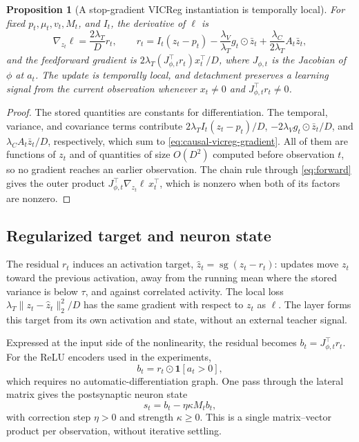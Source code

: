 \documentclass[11pt]{article}
\newtheorem{proposition}{Proposition}
\newcommand{\stopgrad}{\operatorname{sg}}
\begin{document}
\begin{proposition}[A stop-gradient VICReg instantiation is temporally local]
\label{prop:causal-vicreg}
For fixed $p_t,\mu_t,v_t,M_t$, and $I_t$, the derivative of $\ell$ is
\begin{equation}
  \nabla_{z_t}\ell=\frac{2\lambda_T}{D}r_t,
  \qquad
  r_t=I_t(z_t-p_t)-\frac{\lambda_V}{\lambda_T}g_t\odot\bar z_t
       +\frac{\lambda_C}{2\lambda_T}A_t\bar z_t,
  \label{eq:causal-vicreg-gradient}
\end{equation}
and the feedforward gradient is $2\lambda_T(J_{\phi,t}^{\top}r_t)x_t^\top/D$,
where $J_{\phi,t}$ is the Jacobian of $\phi$ at $a_t$. The update is
temporally local, and detachment preserves a learning signal from the current
observation whenever $x_t\neq0$ and $J_{\phi,t}^{\top}r_t\neq0$.
\end{proposition}

\begin{proof}
The stored quantities are constants for differentiation. The temporal,
variance, and covariance terms contribute
$2\lambda_T I_t(z_t-p_t)/D$, $-2\lambda_V g_t\odot\bar z_t/D$, and
$\lambda_C A_t\bar z_t/D$, respectively, which sum to
\cref{eq:causal-vicreg-gradient}. All of them are functions of $z_t$ and of
quantities of size $O(D^2)$ computed before observation $t$, so no gradient
reaches an earlier observation. The chain rule through \cref{eq:forward}
gives the outer product $J_{\phi,t}^{\top}\nabla_{z_t}\ell\,x_t^\top$, which is
nonzero when both of its factors are nonzero.
\end{proof}

\subsection{Regularized target and neuron state}

The residual $r_t$ induces an activation target,
$\widehat z_t=\stopgrad(z_t-r_t)$: updates move $z_t$ toward the previous
activation, away from the running mean where the stored variance is below
$\tau$, and against correlated activity. The local loss
$\lambda_T\lVert z_t-\widehat z_t\rVert_2^2/D$ has the same gradient with
respect to $z_t$ as $\ell$. The layer forms this target from its own
activation and state, without an external teacher signal.

Expressed at the input side of the nonlinearity, the residual becomes
$b_t=J_{\phi,t}^{\top}r_t$. For the ReLU encoders used in the experiments,
\begin{equation}
  b_t=r_t\odot\mathbf 1[a_t>0],
  \label{eq:relu-state}
\end{equation}
which requires no automatic-differentiation graph. One pass through the lateral
matrix gives the postsynaptic neuron state
\begin{equation}
  s_t=b_t-\eta\kappa M_tb_t,
  \label{eq:state-correction}
\end{equation}
with correction step $\eta>0$ and strength $\kappa\geq0$. This is a single
matrix--vector product per observation, without iterative settling.
\end{document}
